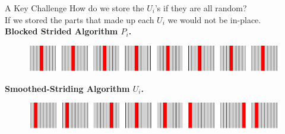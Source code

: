\documentclass[xcolor=x11names, svgnames, rgb]{beamer}
\newcommand{\poly}{\operatorname{poly}}
\newcommand{\polylog}{\operatorname{polylog}}
\newtheorem{proposition}{Proposition}
\begin{document}
\begin{frame}[t]{A Key Challenge}
How do we store the $U_i$'s if they are all random?	\\
\vspace{0.5cm}
If we stored the parts that made up each $U_i$ we would not be in-place.\\
\vspace{0.5cm}
\textbf{Blocked Strided Algorithm $P_i$.}
\begin{figure}
	\includegraphics[width=\linewidth]{imgs/stridedAlgHighlighted.png}
\end{figure}
\textbf{Smoothed-Striding Algorithm $U_i$.}
\begin{figure}
	\includegraphics[width=\linewidth]{imgs/smoothedStridingAlgHighlighted.png}
\end{figure}
\end{frame}




\end{document}
